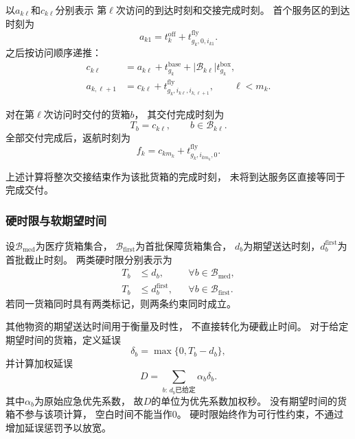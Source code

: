 \documentclass[bwprint]{gmcmthesis}
\begin{document}
以$a_{k\ell}$和$c_{k\ell}$分别表示
第$\ell$次访问的到达时刻和交接完成时刻。
首个服务区的到达时刻为
\begin{equation}
    a_{k1}
    =
    t_k^{\mathrm{off}}
    +
    t_{g_k,0,i_{k1}}^{\mathrm{fly}}.
\end{equation}
之后按访问顺序递推：
\begin{align}
    c_{k\ell}
    &=
    a_{k\ell}
    +t_{g_k}^{\mathrm{base}}
    +|\mathcal{B}_{k\ell}|t_{g_k}^{\mathrm{box}},\\
    a_{k,\ell+1}
    &=
    c_{k\ell}
    +t_{g_k,i_{k\ell},i_{k,\ell+1}}^{\mathrm{fly}},
    \qquad \ell<m_k.
\end{align}

对在第$\ell$次访问时交付的货箱$b$，
其交付完成时刻为
\begin{equation}
    T_b=c_{k\ell},
    \qquad b\in\mathcal{B}_{k\ell}.
\end{equation}
全部交付完成后，返航时刻为
\begin{equation}
    f_k
    =
    c_{km_k}
    +
    t_{g_k,i_{km_k},0}^{\mathrm{fly}}.
\end{equation}

上述计算将整次交接结束作为该批货箱的完成时刻，
未将到达服务区直接等同于完成交付。

\subsubsection{硬时限与软期望时间}

设$\mathcal{B}_{\mathrm{med}}$为医疗货箱集合，
$\mathcal{B}_{\mathrm{first}}$为首批保障货箱集合，
$d_b$为期望送达时刻，$d_b^{\mathrm{first}}$为首批截止时刻。
两类硬时限分别表示为
\begin{align}
    T_b&\leq d_b,
    &&\forall b\in\mathcal{B}_{\mathrm{med}},\\
    T_b&\leq d_b^{\mathrm{first}},
    &&\forall b\in\mathcal{B}_{\mathrm{first}}.
\end{align}
若同一货箱同时具有两类标记，则两条约束同时成立。

其他物资的期望送达时间用于衡量及时性，
不直接转化为硬截止时间。
对于给定期望时间的货箱，定义延误
\begin{equation}
    \delta_b=\max\{0,T_b-d_b\},
\end{equation}
并计算加权延误
\begin{equation}
    D
    =
    \sum_{b:\,d_b\text{已给定}}
    \alpha_b\delta_b.
    \label{eq:q2_delay}
\end{equation}
其中$\alpha_b$为原始应急优先系数，
故$D$的单位为优先系数加权秒。
没有期望时间的货箱不参与该项计算，
空白时间不能当作0。
硬时限始终作为可行性约束，不通过增加延误惩罚予以放宽。
\end{document}
